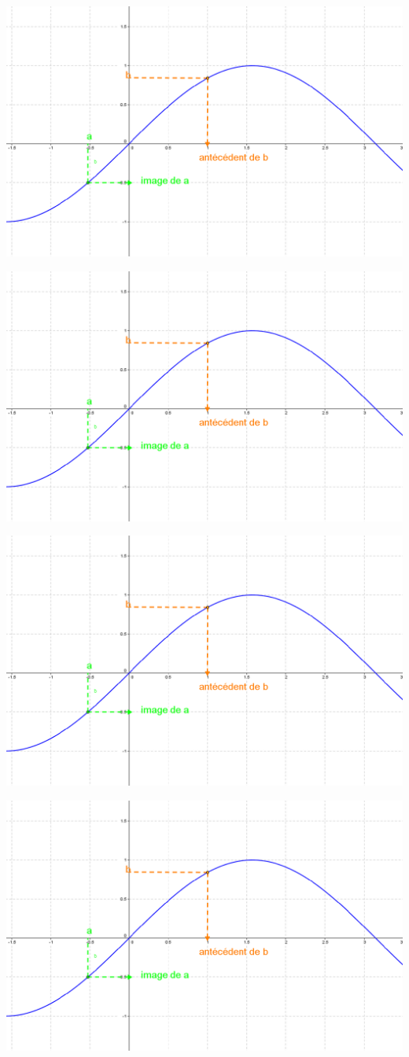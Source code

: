 \documentclass[12pt,a4paper]{article}
\date{}
\title{}
\begin{document}
\includegraphics[scale=0.4]{img/voc}


\includegraphics[scale=0.4]{img/voc}


\includegraphics[scale=0.4]{img/voc}


\includegraphics[scale=0.4]{img/voc}



	


	
\end{document}
